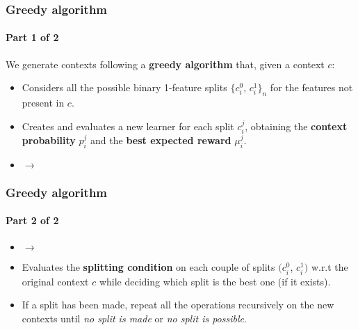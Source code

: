 
\begin{frame}

\frametitle{Greedy algorithm}
\framesubtitle{Part 1 of 2}

We generate contexts following a \textbf{greedy algorithm} that, given a context $c$:

\begin{itemize}[label={*}]
    \item Considers all the possible binary 1-feature splits $\{c_i^0$, $c_i^1\}_n$ for the features not present in $c$.
    \item Creates and evaluates a new learner for each split $c_i^j$, obtaining the \textbf{context probability} $p_i^j$ and the \textbf{best expected reward} $\mu_i^j$.
    \item[] $\rightarrow$
\end{itemize}

\end{frame}


\begin{frame}

\frametitle{Greedy algorithm}
\framesubtitle{Part 2 of 2}

\begin{itemize}[label={*}]
    \item[] $\rightarrow$
    \item Evaluates the \textbf{splitting condition} on each couple of splits $(c_i^0$, $c_i^1)$ w.r.t the original context $c$ while deciding which split is the best one (if it exists).
    \item If a split has been made, repeat all the operations recursively on the new contexts until \textit{no split is made} or \textit{no split is possible}.
\end{itemize}

\end{frame}


